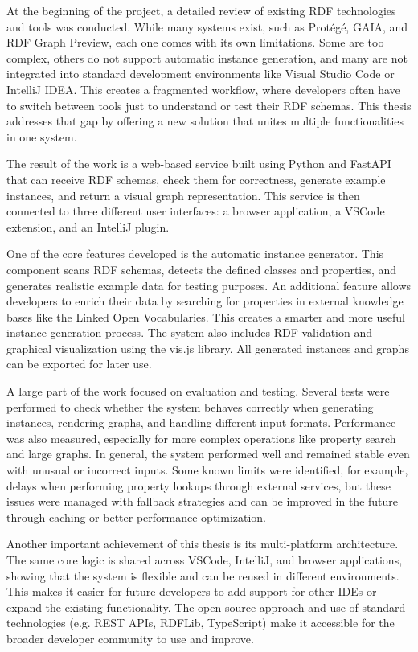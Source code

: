 At the beginning of the project, a detailed review of existing RDF technologies and tools was conducted. While many systems exist, such as Protégé, GAIA, and RDF Graph Preview, each one comes with its own limitations. Some are too complex, others do not support automatic instance generation, and many are not integrated into standard development environments like Visual Studio Code or IntelliJ IDEA. This creates a fragmented workflow, where developers often have to switch between tools just to understand or test their RDF schemas. This thesis addresses that gap by offering a new solution that unites multiple functionalities in one system.

The result of the work is a web-based service built using Python and FastAPI that can receive RDF schemas, check them for correctness, generate example instances, and return a visual graph representation. This service is then connected to three different user interfaces: a browser application, a VSCode extension, and an IntelliJ plugin. 

One of the core features developed is the automatic instance generator. This component scans RDF schemas, detects the defined classes and properties, and generates realistic example data for testing purposes. An additional feature allows developers to enrich their data by searching for properties in external knowledge bases like the Linked Open Vocabularies. This creates a smarter and more useful instance generation process. The system also includes RDF validation and graphical visualization using the vis.js library. All generated instances and graphs can be exported for later use.

A large part of the work focused on evaluation and testing. Several tests were performed to check whether the system behaves correctly when generating instances, rendering graphs, and handling different input formats. Performance was also measured, especially for more complex operations like property search and large graphs. In general, the system performed well and remained stable even with unusual or incorrect inputs. Some known limits were identified, for example, delays when performing property lookups through external services, but these issues were managed with fallback strategies and can be improved in the future through caching or better performance optimization.

Another important achievement of this thesis is its multi-platform architecture. The same core logic is shared across VSCode, IntelliJ, and browser applications, showing that the system is flexible and can be reused in different environments. This makes it easier for future developers to add support for other IDEs or expand the existing functionality. The open-source approach and use of standard technologies (e.g. REST APIs, RDFLib, TypeScript) make it accessible for the broader developer community to use and improve.


